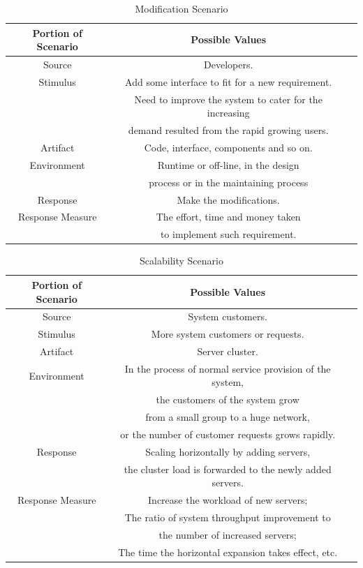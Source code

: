 \documentclass{article}
\begin{document}
	\begin{center}
		\begin{table}[!htb]
		\begin{tabular}{ccc}
		\toprule  
		Portion of Scenario & Possible Values\\
		\midrule 
		Source & Developers.\\
		Stimulus & Add some interface to fit for a new requirement.\\
		& Need to improve the system to cater for the increasing \\
		& demand resulted from the rapid growing users.\\
		Artifact & Code, interface, components and so on.\\
		Environment & Runtime or off-line, in the design \\
		& process or in the maintaining process\\
		Response & Make the modifications.\\
		Response Measure & The effort, time and money taken\\
		& to implement such requirement.\\
		\bottomrule
		\end{tabular}
		\caption{Modification Scenario}
		\end{table}
	\end{center}

	\begin{center}
		\begin{table}[!htb]
		\begin{tabular}{ccc}
		\toprule  
		Portion of Scenario & Possible Values\\
		\midrule 
		Source & System customers.\\
		Stimulus & More system customers or requests.\\
		Artifact & Server cluster.\\
		Environment & In the process of normal service provision of the system, \\
		& the customers of the system grow \\
		& from a small group to a huge network, \\
		& or the number of customer requests grows rapidly.\\
		Response & Scaling horizontally by adding servers, \\
		& the cluster load is forwarded to the newly added servers.\\
		Response Measure & Increase the workload of new servers; \\
		& The ratio of system throughput improvement to \\
		& the number of increased servers; \\
		& The time the horizontal expansion takes effect, etc.\\
		\bottomrule
		\end{tabular}
		\caption{Scalability Scenario}
		\end{table}
	\end{center}
\end{document}

